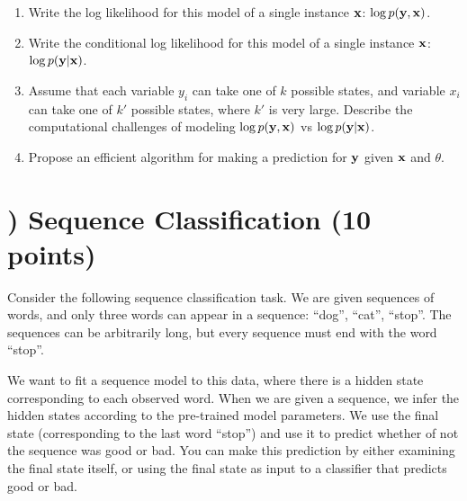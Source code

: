 \documentclass[11pt]{article}
\newcommand{\vx}{{\bf x}}
\newcommand{\vy}{{\bf y}}
\newcounter{QuestionCounter}
\newcounter{SubQuestionCounter}[QuestionCounter]
\newcommand{\newquestion}{\stepcounter{QuestionCounter}\setcounter{SubQuestionCounter}{1}\newpage}
\begin{document}
\begin{enumerate}[label=(\alph*)]
\item Write the log likelihood for this model of a single instance $\vx$: $\log{p(\vy,\vx)}$. 

\begin{answertext}{6 cm}{}

\end{answertext}
\newpage
\item Write the conditional log likelihood for this model of a single instance $\vx$: $\log{p(\vy|\vx)}$. 

\begin{answertext}{6 cm}{}

\end{answertext}
\item Assume that each variable $y_i$ can take one of $k$ possible states, and variable $x_i$ can take one of $k'$ possible states, where $k'$ is very large. Describe the computational challenges of modeling $\log p(\vy,\vx)$ vs $\log p(\vy|\vx)$.

\begin{answertext}{6 cm}{}

\end{answertext}
\item Propose an efficient algorithm for making a prediction for $\vy$ given $\vx$ and $\theta$.

\begin{answertext}{4 cm}{}

\end{answertext}
\end{enumerate}



\newquestion
\section*{) Sequence Classification (10 points)}
Consider the following sequence classification task. We are given sequences of words, and only three words can appear in a sequence: ``dog'', ``cat'', ``stop''. The sequences can be arbitrarily long, but every sequence must end with the word ``stop''. 

We want to fit a sequence model to this data, where there is a hidden state corresponding to each observed word. When we are given a sequence, we infer the hidden states according to the pre-trained model parameters. We use the final state (corresponding to the last word ``stop'') and use it to predict whether of not the sequence was {\sc good} or {\sc bad}. You can make this prediction by either examining the final state itself, or using the final state as input to a classifier that predicts {\sc good} or {\sc bad}.
\end{document}
